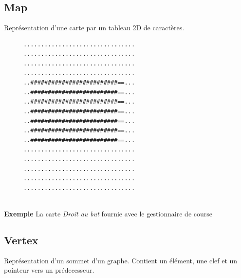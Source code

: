\documentclass[a4paper,10pt]{article}
\begin{document}
\subsection{Map} Représentation d'une carte par un tableau 2D de caractères. \\
\begin{figure}[!h]
 \begin{verbatim}
................................
................................
................................
................................
..#########################==...
..#########################==...
..#########################==...
..#########################==...
..#########################==...
..#########################==...
..#########################==...
................................
................................
................................
................................
................................
\end{verbatim}
\end{figure}
\\
\textbf{Exemple} La carte \textit{Droit au but} fournie avec le gestionnaire de course \\
\subsection{Vertex} Représentation d'un sommet d'un graphe. Contient un élément, une clef et un pointeur vers un prédecesseur.
\end{document}
